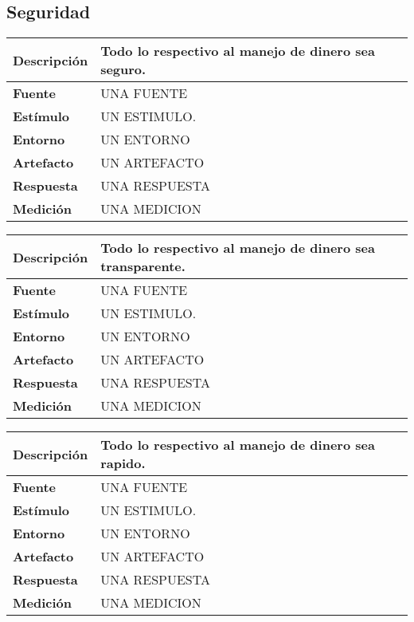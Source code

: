 \subsection{Seguridad}

\begin{center}
  \begin{tabular}{| l | p{10cm} | }
    \hline
  \textbf{Descripción} & Todo lo respectivo al manejo de dinero sea seguro.\\  \hline
  \textbf{Fuente} & UNA FUENTE\\  \hline
  \textbf{Estímulo} & UN ESTIMULO.\\  \hline
  \textbf{Entorno} & UN ENTORNO\\  \hline
  \textbf{Artefacto} & UN ARTEFACTO\\  \hline
  \textbf{Respuesta} & UNA RESPUESTA\\  \hline
  \textbf{Medición} & UNA MEDICION\\  \hline
  \end{tabular}
\end{center} 

\begin{center}
  \begin{tabular}{| l | p{10cm} | }
    \hline
  \textbf{Descripción} & Todo lo respectivo al manejo de dinero sea transparente.\\  \hline
  \textbf{Fuente} & UNA FUENTE\\  \hline
  \textbf{Estímulo} & UN ESTIMULO.\\  \hline
  \textbf{Entorno} & UN ENTORNO\\  \hline
  \textbf{Artefacto} & UN ARTEFACTO\\  \hline
  \textbf{Respuesta} & UNA RESPUESTA\\  \hline
  \textbf{Medición} & UNA MEDICION\\  \hline
  \end{tabular}
\end{center} 

\begin{center}
  \begin{tabular}{| l | p{10cm} | }
    \hline
  \textbf{Descripción} & Todo lo respectivo al manejo de dinero sea rapido.\\  \hline
  \textbf{Fuente} & UNA FUENTE\\  \hline
  \textbf{Estímulo} & UN ESTIMULO.\\  \hline
  \textbf{Entorno} & UN ENTORNO\\  \hline
  \textbf{Artefacto} & UN ARTEFACTO\\  \hline
  \textbf{Respuesta} & UNA RESPUESTA\\  \hline
  \textbf{Medición} & UNA MEDICION\\  \hline
  \end{tabular}
\end{center} 

